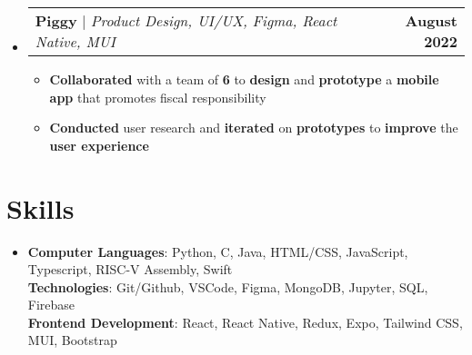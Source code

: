 \documentclass[letterpaper,11pt]{article}
\makeatletter
\newcommand{\resumeItem}[1]{
  
  \item\small{
    {#1 \vspace{2pt}}
  }
}
\newcommand{\resumeProjectHeading}[2]{
  \item
    \begin{tabular*}{1.001\textwidth}{l@{\extracolsep{\fill}}r}
      \normalsize#1 & \textbf{\small #2}\\
    \end{tabular*}\vspace{-5pt}
}
\newcommand{\resumeSubHeadingListStart}{\begin{itemize}[leftmargin=0.0in, label={}]}
\newcommand{\resumeSubHeadingListEnd}{\end{itemize}}
\newcommand{\resumeItemListStart}{\begin{itemize}}
\newcommand{\resumeItemListEnd}{\end{itemize}\vspace{-2pt}}
\makeatother
\begin{document}
    \resumeSubHeadingListStart
    \resumeProjectHeading
      {\textbf{Piggy} | \small\textit{Product Design, UI/UX, Figma, React Native, MUI}}{August 2022}
      \resumeItemListStart
      \resumeItem{\textbf{Collaborated} with a team of \textbf{6} to \textbf{design} and \textbf{prototype} a \textbf{mobile app} that promotes fiscal responsibility}
      \resumeItem{\textbf{Conducted} user research and \textbf{iterated} on \textbf{prototypes} to \textbf{improve} the \textbf{user experience}}
      \resumeItemListEnd
      
   
      \resumeSubHeadingListEnd
    

\vspace{-16pt}


\section{Skills}
 \begin{itemize}[leftmargin=0.15in, label={}]
    \item{
      \textbf{Computer Languages}{: Python, C, Java, HTML/CSS, JavaScript, Typescript, RISC-V Assembly, Swift} \\
      \vspace{4pt}
      \textbf{Technologies}{: Git/Github, VSCode, Figma, MongoDB, Jupyter, SQL, Firebase} \\
      \vspace{4pt}
      \textbf{Frontend Development}{: React, React Native, Redux, Expo, Tailwind CSS, MUI, Bootstrap} \\
    }

 \end{itemize}
 \vspace{-10pt}
 
                
\end{document}
